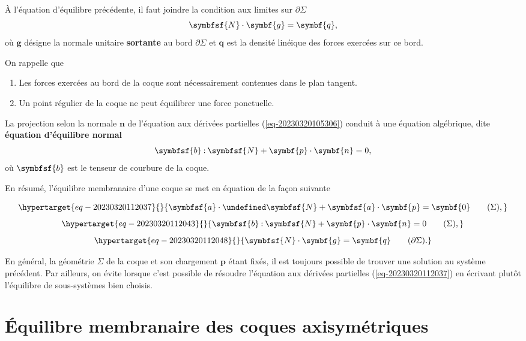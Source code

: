 \documentclass[
  a4paper,
  DIV=11,
  numbers=noendperiod]{scrreprt}
\providecommand{\tightlist}{%
  \setlength{\itemsep}{0pt}\setlength{\parskip}{0pt}}\usepackage{longtable,booktabs,array}
\newcommand{\dbldot}{\mathbin{\mathord{:}}}
\let\div\undefined
\newcommand{\div}{\operatorname{div}}
\newcommand{\tens}[1]{\symbfsf{#1}}
\renewcommand{\vec}[1]{\symbf{#1}}
\begin{document}
À l'équation d'équilibre précédente, il faut joindre la condition aux
limites sur \(\partial \Sigma\) \[
\tens{N} \cdot \vec{g} = \vec{q},
\] où \(\vec{g}\) désigne la normale unitaire \textbf{sortante} au bord
\(\partial \Sigma\) et \(\vec{q}\) est la densité linéique des forces
exercées sur ce bord.

On rappelle que

\begin{enumerate}
\def\labelenumi{\arabic{enumi}.}
\tightlist
\item
  Les forces exercées au bord de la coque sont nécessairement contenues
  dans le plan tangent.
\item
  Un point régulier de la coque ne peut équilibrer une force ponctuelle.
\end{enumerate}

La projection selon la normale \(\vec{n}\) de l'équation aux dérivées
partielles (\ref{eq-20230320105306}) conduit à une équation algébrique,
dite \textbf{équation d'équilibre normal} \[
\tens{b} \dbldot \tens{N} + \vec{p} \cdot \vec{n} = 0,
\] où \(\tens{b}\) est le tenseur de courbure de la coque.

En résumé, l'équilibre membranaire d'une coque se met en équation de la
façon suivante

\begin{equation}\protect\hypertarget{eq-20230320112037}{}{
\tens{a} \cdot \div \tens{N} + \tens{a} \cdot \vec{p} = \vec{0} \qquad (\Sigma),
}\label{eq-20230320112037}\end{equation}
\begin{equation}\protect\hypertarget{eq-20230320112043}{}{
\tens{b} \dbldot \tens{N} + \vec{p} \cdot \vec{n} = 0 \qquad (\Sigma),
}\label{eq-20230320112043}\end{equation}
\begin{equation}\protect\hypertarget{eq-20230320112048}{}{
\tens{N} \cdot \vec{g} = \vec{q} \qquad (\partial \Sigma).
}\label{eq-20230320112048}\end{equation}

En général, la géométrie \(\Sigma\) de la coque et son chargement
\(\vec{p}\) étant fixés, il est toujours possible de trouver une
solution au système précédent. Par ailleurs, on évite lorsque c'est
possible de résoudre l'équation aux dérivées partielles
(\ref{eq-20230320112037}) en écrivant plutôt l'équilibre de
sous-systèmes bien choisis.

\hypertarget{uxe9quilibre-membranaire-des-coques-axisymuxe9triques}{%
\section{Équilibre membranaire des coques
axisymétriques}\label{uxe9quilibre-membranaire-des-coques-axisymuxe9triques}}
\end{document}
